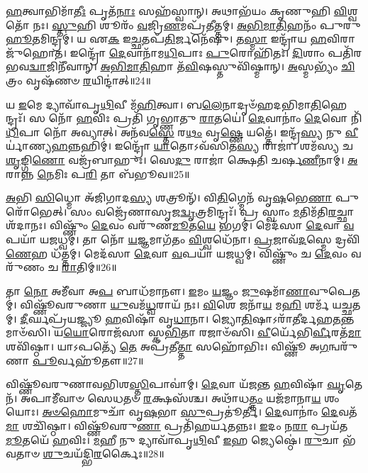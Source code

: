 \-\ul{𑌹}\-𑌤𑍍𑌵𑌾𑌭𑌿𑌮𑌾᳴\-\ul{𑌤𑍀𑌃} 𑌪𑍃𑌤᳴\-\ul{𑌨𑌾𑌃} 𑌸𑌹᳴𑌸𑍍𑌵𑌾𑌨𑍍।
𑌅𑌥𑌾𑌭᳴𑌯𑌂 𑌕𑍃𑌣𑍁𑌹𑌿 \ul{𑌵𑌿}\-𑌶𑍍𑌵𑌤𑍋᳴ 𑌨𑌃।
\-\ul{𑌸𑍍𑌤𑍁}\-𑌹𑌿 𑌶𑍂𑌰𑌂᳴ \ul{𑌵}\-𑌜𑍍𑌰𑌿\-\ul{𑌣}\-𑌮𑌪𑍍𑌰᳴𑌤𑍀𑌤𑍍𑌤𑌮𑍍।
\-\ul{𑌅}\-\-\ul{𑌭𑌿}\-\-\ul{𑌮𑌾}\-\-\ul{𑌤𑌿}\-𑌹𑌨𑌂᳴ 𑌪𑍁𑌰𑍁\-\ul{𑌹𑍂}\-𑌤𑌮𑌿𑌨𑍍𑌦𑍍𑌰𑌮𑍍॑।
𑌯 𑌏\-\ul{𑌕} 𑌇\-\ul{𑌚𑍍𑌛}\-𑌤𑌪᳴\-\ul{𑌤𑌿}\-𑌰𑍍𑌜𑌨𑍇᳴𑌷𑍁।
𑌤\-\ul{𑌸𑍍𑌮𑌾} 𑌇𑌨𑍍𑌦𑍍𑌰𑌾᳴𑌯 \ul{𑌹}\-𑌵𑌿𑌰𑌾 𑌜𑍁᳴𑌹𑍋𑌤।
𑌇𑌨𑍍𑌦𑍍𑌰𑍋᳴ \ul{𑌦𑍇}\-𑌵𑌾𑌨𑌾᳴𑌮\-\ul{𑌧𑌿}\-𑌪𑌾𑌃 \ul{𑌪𑍁}\-𑌰𑍋𑌹𑌿᳴𑌤𑌃।
\-\ul{𑌦𑌿}\-𑌶𑌾𑌂 𑌪𑌤𑌿᳴𑌰𑌭𑌵\-\ul{𑌦𑍍𑌵𑌾}\-𑌜𑌿𑌨𑍀᳴𑌵𑌾𑌨𑍍।
\-\ul{𑌅}\-\-\ul{𑌭𑌿}\-\-\ul{𑌮𑌾}\-\-\ul{𑌤𑌿}\-𑌹𑌾 𑌤᳴\-\ul{𑌵𑌿}\-𑌷𑌸𑍍𑌤𑍁𑌵𑌿᳴𑌷𑍍𑌮𑌾𑌨𑍍।
\-\ul{𑌅}\-𑌸𑍍𑌮𑌭𑍍𑌯𑌂᳴ \ul{𑌚𑌿}\-𑌤𑍍𑌰𑌂 𑌵𑍃𑌷᳴𑌣𑍞 \ul{𑌰}\-𑌯𑌿𑌨𑍍𑌦𑌾॑𑌤𑍍॥24॥

𑌯 \ul{𑌇}\-𑌮𑍇 𑌦𑍍𑌯𑌾𑌵𑌾᳴𑌪𑍃\-\ul{𑌥𑌿}\-𑌵𑍀 𑌮᳴\-\ul{𑌹𑌿}\-𑌤𑍍𑌵𑌾।
𑌬\-\ul{𑌲𑍇}\-𑌨𑌾𑌦𑍃𑍞᳴𑌹𑌦𑌭𑌿𑌮𑌾\-\ul{𑌤𑌿}\-𑌹𑍇𑌨𑍍𑌦𑍍𑌰𑌃᳴।
𑌸 𑌨𑍋᳴ \ul{𑌹}\-𑌵𑌿𑌃 𑌪𑍍𑌰𑌤𑌿᳴ 𑌗𑍃𑌭𑍍𑌣𑌾𑌤𑍁 \ul{𑌰𑌾}\-𑌤𑌯𑍇॑।
\-\ul{𑌦𑍇}\-𑌵𑌾𑌨𑌾𑌂॑ \ul{𑌦𑍇}\-𑌵𑍋 𑌨𑌿᳴\-\ul{𑌧𑌿}\-𑌪𑌾 𑌨𑍋᳴ 𑌅𑌵𑍍𑌯𑌾𑌤𑍍।
𑌅𑌨᳴𑌵\-\ul{𑌸𑍍𑌤𑍇} 𑌰\-\ul{𑌥𑌂} 𑌵𑍃\-\ul{𑌷𑍍𑌣𑍇} 𑌯𑌤𑍍𑌤𑍇॑।
𑌇𑌨𑍍𑌦𑍍𑌰᳴\-\ul{𑌸𑍍𑌯} 𑌨𑍁 \ul{𑌵𑍀}\-𑌰𑍍𑌯𑌾॑𑌣𑍍𑌯\-\ul{𑌹}\-𑌨𑍍𑌨𑌹𑌿𑌮𑍍॑।
𑌇𑌨𑍍𑌦𑍍𑌰𑍋᳴ \ul{𑌯𑌾}\-𑌤𑍋\-𑌽𑌵᳴𑌸𑌿𑌤\-\ul{𑌸𑍍𑌯} 𑌰𑌾𑌜𑌾॑।
𑌶𑌮᳴𑌸𑍍𑌯 𑌚 \ul{𑌶𑍃}\-𑌙𑍍𑌗𑌿\-\ul{𑌣𑍋} 𑌵𑌜𑍍𑌰᳴𑌬𑌾𑌹𑍁𑌃।
𑌸𑍇\-\ul{𑌦𑍁} 𑌰𑌾𑌜𑌾॑ 𑌕𑍍𑌷𑍇𑌤𑌿 𑌚𑌰𑍍\mbox{}𑌷\-\ul{𑌣𑍀}\-𑌨𑌾𑌮𑍍।
\-\ul{𑌅}\-𑌰𑌾𑌨𑍍𑌨 \ul{𑌨𑍇}\-𑌮𑌿𑌃 𑌪\-\ul{𑌰𑌿} 𑌤𑌾 𑌬᳴𑌭𑍂𑌵॥25॥

\-\ul{𑌅}\-𑌭𑌿 \ul{𑌸𑌿}\-𑌧𑍍𑌮𑍋 𑌅᳴𑌜𑌿𑌗𑌾𑌦\-\ul{𑌸𑍍𑌯} 𑌶𑌤𑍍𑌰𑍂𑌨𑍍᳴।
𑌵𑌿\-\ul{𑌤𑌿}\-𑌗𑍍𑌮𑍇𑌨᳴ 𑌵𑍃\-\ul{𑌷}\-𑌭𑍇\-\ul{𑌣𑌾} 𑌪𑍁𑌰𑍋᳴𑌭𑍇𑌤𑍍।
𑌸𑌂 𑌵𑌜𑍍𑌰𑍇᳴𑌣𑌾𑌸𑍃𑌜\-\ul{𑌦𑍍𑌵𑍃}\-𑌤𑍍𑌰𑌮𑌿𑌨𑍍𑌦𑍍𑌰𑌃᳴।
𑌪𑍍𑌰 𑌸𑍍𑌵𑌾𑌂 \ul{𑌮}\-𑌤𑌿𑌮᳴𑌤𑌿\-\ul{𑌰}\-𑌚𑍍𑌛𑌾𑌶᳴𑌦𑌾𑌨𑌃।
𑌵𑌿𑌷𑍍𑌣𑍁𑌂᳴ \ul{𑌦𑍇}\-𑌵𑌂 𑌵𑌰𑍁᳴𑌣\-\ul{𑌮𑍂}\-𑌤\-\ul{𑌯𑍇} 𑌭𑌗𑌮𑍍॑।
𑌮𑍇𑌦᳴𑌸𑌾 \ul{𑌦𑍇}\-𑌵𑌾 \ul{𑌵}\-𑌪𑌯𑌾᳴ 𑌯𑌜𑌧𑍍𑌵𑌮𑍍।
𑌤𑌾 𑌨𑍋᳴ \ul{𑌯}\-𑌜𑍍𑌞𑌮𑌾𑌗᳴𑌤𑌂 \ul{𑌵𑌿}\-𑌶𑍍𑌵𑌧𑍇᳴𑌨𑌾।
\-\ul{𑌪𑍍𑌰}\-𑌜𑌾𑌵᳴\-\ul{𑌦}\-𑌸𑍍𑌮𑍇 𑌦𑍍𑌰𑌵𑌿᳴\-\ul{𑌣𑍇}\-𑌹 𑌧᳴𑌤𑍍𑌤𑌮𑍍।
𑌮𑍇𑌦᳴𑌸𑌾 \ul{𑌦𑍇}\-𑌵𑌾 \ul{𑌵}\-𑌪𑌯𑌾᳴ 𑌯𑌜𑌧𑍍𑌵𑌮𑍍।
𑌵𑌿𑌷𑍍𑌣𑍁𑌂᳴ 𑌚 \ul{𑌦𑍇}\-𑌵𑌂 𑌵𑌰𑍁᳴𑌣𑌂 𑌚 \ul{𑌰𑌾}\-𑌤𑌿𑌮𑍍॥26॥

𑌤𑌾 \ul{𑌨𑍋} 𑌅𑌮𑍀᳴𑌵𑌾 𑌅\-\ul{𑌪} 𑌬𑌾𑌧᳴𑌮𑌾𑌨𑍗।
\-\ul{𑌇}\-𑌮𑌂 \ul{𑌯}\-𑌜𑍍𑌞𑌂 \ul{𑌜𑍁}\-𑌷𑌮𑌾᳴\-\ul{𑌣𑌾}\-𑌵𑍁𑌪𑍇𑌤𑌮𑍍॑।
𑌵𑌿𑌷𑍍𑌣𑍂᳴𑌵𑌰𑍁𑌣𑌾 \ul{𑌯𑍁}\-𑌵𑌮᳴\-\ul{𑌧𑍍𑌵}\-𑌰𑌾𑌯᳴ 𑌨𑌃।
\-\ul{𑌵𑌿}\-𑌶𑍇 𑌜𑌨𑌾᳴\-\ul{𑌯} 𑌮\-\ul{𑌹𑌿} 𑌶𑌰𑍍𑌮᳴ 𑌯𑌚𑍍𑌛𑌤𑌮𑍍।
\-\ul{𑌦𑍀}\-𑌰𑍍𑌘𑌪𑍍𑌰᳴𑌯𑌜𑍍𑌜𑍍𑌯𑍂 \ul{𑌹}\-𑌵𑌿𑌷𑌾᳴ 𑌵𑍃\-\ul{𑌧𑌾}\-𑌨𑌾।
𑌜𑍍𑌯𑍋\-\ul{𑌤𑌿}\-𑌷𑌾\-𑌽𑌰𑌾᳴𑌤𑍀𑌰𑍍𑌦𑌹\-\-\ul{𑌤}\-𑌨𑍍𑌤𑌮𑌾𑍞᳴𑌸𑌿।
𑌯\-\ul{𑌯𑍋}\-𑌰𑍋𑌜᳴𑌸𑌾 𑌸𑍍𑌕\-\ul{𑌭𑌿}\-𑌤𑌾 𑌰𑌜𑌾𑍞᳴𑌸𑌿।
\-\ul{𑌵𑍀}\-𑌰𑍍𑌯𑍇᳴𑌭𑌿\-\ul{𑌰𑍍𑌵𑍀}\-𑌰𑌤᳴\-\ul{𑌮𑌾} 𑌶𑌵𑌿᳴𑌷𑍍𑌠𑌾।
𑌯𑌾𑌽𑌪𑌤𑍍𑌯𑍇᳴ \ul{𑌤𑍇} 𑌅𑌪𑍍𑌰᳴𑌤𑍀\-\ul{𑌤𑍍𑌤𑌾} 𑌸𑌹𑍋᳴𑌭𑌿𑌃।
𑌵𑌿𑌷𑍍𑌣𑍂᳴ 𑌅\-\ul{𑌗}\-𑌨𑍍𑌵𑌰𑍁᳴𑌣𑌾 \ul{𑌪𑍂}\-𑌰𑍍𑌵𑌹𑍂᳴𑌤𑍗॥27॥

𑌵𑌿𑌷𑍍𑌣𑍂᳴𑌵𑌰𑍁𑌣𑌾𑌵𑌭𑌿𑌶\-\ul{𑌸𑍍𑌤𑌿}\-𑌪𑌾𑌵𑌾॑𑌮𑍍।
\-\ul{𑌦𑍇}\-𑌵𑌾 𑌯᳴𑌜𑌨𑍍𑌤 \ul{𑌹}\-𑌵𑌿𑌷𑌾᳴ \ul{𑌘𑍃}\-𑌤𑍇𑌨᳴।
𑌅𑌪𑌾𑌮𑍀᳴𑌵𑌾𑍞 𑌸𑍇𑌧𑌤𑍞 \ul{𑌰}\-𑌕𑍍𑌷𑌸᳴𑌶𑍍𑌚।
𑌅𑌥𑌾᳴𑌧\-\ul{𑌤𑍍𑌤𑌂} 𑌯𑌜᳴𑌮𑌾𑌨𑌾\-\ul{𑌯} 𑌶𑌂 𑌯𑍋𑌃।
\-\ul{𑌅}\-\-\ul{𑍞}\-\-\ul{𑌹𑍋}\-𑌮𑍁𑌚𑌾᳴ 𑌵𑍃\-\ul{𑌷}\-𑌭𑌾 \ul{𑌸𑍁}\-𑌪𑍍𑌰𑌤𑍂॑𑌰𑍍𑌤𑍀।
\-\ul{𑌦𑍇}\-𑌵𑌾𑌨𑌾𑌂॑ \ul{𑌦𑍇}\-𑌵𑌤᳴\-\ul{𑌮𑌾} 𑌶𑌚𑌿᳴𑌷𑍍𑌠𑌾।
𑌵𑌿𑌷𑍍𑌣𑍂᳴𑌵𑌰𑍁\-\ul{𑌣𑌾} 𑌪𑍍𑌰𑌤𑌿᳴\-𑌹𑌰𑍍𑌯𑌤𑌨𑍍𑌨𑌃।
\-\ul{𑌇}\-𑌦𑌂 𑌨\-\ul{𑌰𑌾} 𑌪𑍍𑌰𑌯᳴𑌤\-\ul{𑌮𑍂}\-𑌤𑌯𑍇᳴ \ul{𑌹}\-𑌵𑌿𑌃।
\-\ul{𑌮}\-𑌹𑍀 𑌨𑍁 𑌦𑍍𑌯𑌾𑌵𑌾᳴𑌪𑍃\-\ul{𑌥𑌿}\-𑌵𑍀 \ul{𑌇}\-𑌹 𑌜𑍍𑌯𑍇𑌷𑍍𑌠𑍇॑।
\-\ul{𑌰𑍁}\-𑌚𑌾 𑌭᳴𑌵𑌤𑌾𑍞 \ul{𑌶𑍁}\-𑌚𑌯᳴𑌦𑍍𑌭𑌿\-\ul{𑌰}\-𑌰𑍍𑌕𑍈𑌃॥28॥

